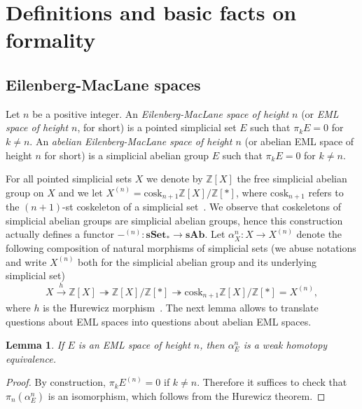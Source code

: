 \documentclass{amsart}
\newtheorem{lemma}[formula]{Lemma}
\theoremstyle{definition}
\theoremstyle{remark}
\newcommand{\sset}{\mathbf{sSet}}
\newcommand{\sab}{\mathbf{sAb}}
\begin{document}
\section{Definitions and basic facts on formality}\label{sec:defform}
	
\subsection{Eilenberg-MacLane spaces}
Let $n$ be a positive integer.
An \emph{Eilenberg-MacLane space  of height $n$} (or \emph{EML space of height $n$}, for short) is a pointed simplicial set $E$ such that $\pi_kE=0$ for $k\ne n$. An \emph{abelian Eilenberg-MacLane space of height $n$} (or abelian EML space of height $n$ for short) is a simplicial abelian group $E$ such that $\pi_kE=0$ for $k\ne n$. 

For all pointed simplicial sets $X$ we denote by $\mathbb{Z}[X]$ the free simplicial abelian group on $X$ and we let $X^{(n)}=\mathrm{cosk}_{n+1}\mathbb{Z}[X]/\mathbb{Z}[*]$, where $\mathrm{cosk}_{n+1}$ refers to the $(n+1)$-st coskeleton of a simplicial set~\cite{dk-84}. We observe that coskeletons of simplicial abelian groups are simplicial abelian groups, hence this construction actually defines a functor
$-^{(n)}:\sset_*\to \sab$.
Let $\alpha_{X}^{n}\colon X\to X^{(n)}$ denote the following composition of natural morphisms of simplicial sets (we abuse notations and write $X^{(n)}$ both for the simplicial abelian group and its underlying simplicial set)
\[
X\xrightarrow[]{h}\mathbb{Z}[X]\twoheadrightarrow \mathbb{Z}[X]/\mathbb{Z}[*] \twoheadrightarrow \mathrm{cosk}_{n+1}\mathbb{Z}[X]/\mathbb{Z}[*] =X^{(n)},
\]
where $h$ is the Hurewicz morphism~\cite[Chapter~8, Application~8.3.9]{we-97}. The next lemma allows to translate questions about EML spaces into questions about abelian EML spaces.

\begin{lemma}\label{lm:1}
	If $E$ is an EML space of height $n$, then $\alpha_{E}^{n}$ is a weak homotopy equivalence.     
\end{lemma}
\begin{proof}
	By construction, $\pi_k E^{(n)}=0$ if $k\ne n$. Therefore it suffices to check that $\pi_n(\alpha_{E}^{n})$ is an isomorphism, which follows from the Hurewicz theorem.
\end{proof}
\end{document}
